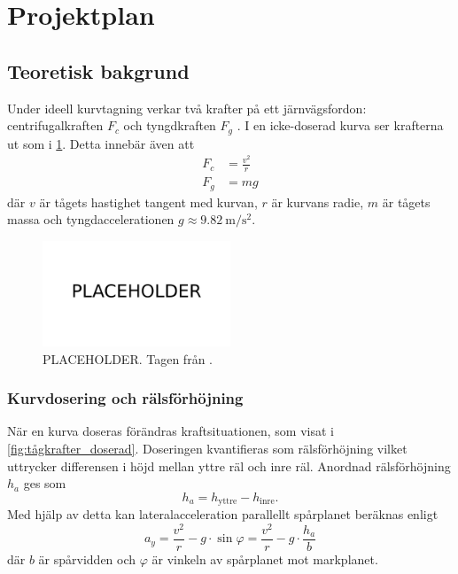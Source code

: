 \section{Projektplan}
\subsection{Teoretisk bakgrund}
Under ideell kurvtagning verkar två krafter på ett järnvägsfordon: centrifugalkraften $F_c$ och tyngdkraften $F_g$ \parencite{carlos}. I en icke-doserad kurva ser krafterna ut som i \cref{fig:tågkrafter}. Detta innebär även att
\begin{align}
    F_c &= \frac{v^2}{r} \\
    F_g &= mg
\end{align}
där $v$ är tågets hastighet tangent med kurvan, $r$ är kurvans radie, $m$ är tågets massa och tyngdaccelerationen $g\approx \SI{9.82}{\m\per\s\squared}$.

\begin{figure}[h]
    \centering
    \includegraphics[width=0.5\textwidth]{fig/placeholder.png}
    \caption{PLACEHOLDER. Tagen från \textcite{carlos}.}
    \label{fig:tågkrafter}
\end{figure}


\subsubsection{Kurvdosering och rälsförhöjning}
När en kurva doseras förändras kraftsituationen, som visat i \cref{fig:tågkrafter_doserad}. Doseringen kvantifieras som rälsförhöjning vilket uttrycker differensen i höjd mellan yttre räl och inre räl. Anordnad rälsförhöjning $h_a$ ges som
\begin{equation}
    h_a = h_\mathrm{yttre} - h_\mathrm{inre}.
\end{equation}
Med hjälp av detta kan lateralacceleration parallellt spårplanet beräknas enligt \parencite{carlos}
\begin{equation}
    a_y = \frac{v^2}{r}-g\cdot\sin{\varphi} = \frac{v^2}{r} - g\cdot \frac{h_a}{b}
    \label{eq:ay}
\end{equation}
där $b$ är spårvidden och $\varphi$ är vinkeln av spårplanet mot markplanet.

